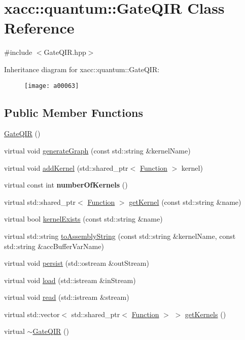 \hypertarget{a00063}{}\section{xacc\+:\+:quantum\+:\+:Gate\+Q\+IR Class Reference}
\label{a00063}


{\ttfamily \#include $<$Gate\+Q\+I\+R.\+hpp$>$}

Inheritance diagram for xacc\+:\+:quantum\+:\+:Gate\+Q\+IR\+:\begin{figure}[H]
\begin{center}
\leavevmode
\texttt{[image: a00063]}
\end{center}
\end{figure}
\subsection*{Public Member Functions}
\begin{DoxyCompactItemize}
\item 
\hyperlink{a00063_afb99f610a6b123538c659169c131a634}{Gate\+Q\+IR} ()
\item 
virtual void \hyperlink{a00063_ad1ddd6105346dd9fc78648fd812285ed}{generate\+Graph} (const std\+::string \&kernel\+Name)
\item 
virtual void \hyperlink{a00063_aa6ed2cf2cbcfec8105c327a4fa95346f}{add\+Kernel} (std\+::shared\+\_\+ptr$<$ \hyperlink{a00059}{Function} $>$ kernel)
\item 
virtual const int {\bfseries number\+Of\+Kernels} ()\hypertarget{a00063_aca6be85526b14f500e7f98954dd6da5c}{}\label{a00063_aca6be85526b14f500e7f98954dd6da5c}

\item 
virtual std\+::shared\+\_\+ptr$<$ \hyperlink{a00059}{Function} $>$ \hyperlink{a00063_a194758b6edcc3ae0c7fe8004f9bfe690}{get\+Kernel} (const std\+::string \&name)
\item 
virtual bool \hyperlink{a00063_a692f95099caa7c024110a3f035941dca}{kernel\+Exists} (const std\+::string \&name)
\item 
virtual std\+::string \hyperlink{a00063_a7153f7e9f516d43af3d5d4f95d60bd86}{to\+Assembly\+String} (const std\+::string \&kernel\+Name, const std\+::string \&acc\+Buffer\+Var\+Name)
\item 
virtual void \hyperlink{a00063_a40e1d07e4dfd3794ef53fca3cdbdca61}{persist} (std\+::ostream \&out\+Stream)
\item 
virtual void \hyperlink{a00063_a07f26eeb362ac480d20da6cdc8c8fb39}{load} (std\+::istream \&in\+Stream)
\item 
virtual void \hyperlink{a00063_a26019e2f1e13e64645e29aee86ac58b1}{read} (std\+::istream \&stream)
\item 
virtual std\+::vector$<$ std\+::shared\+\_\+ptr$<$ \hyperlink{a00059}{Function} $>$ $>$ \hyperlink{a00063_a4ace7ee5ebef84b1f39aaf5ed12c6cc6}{get\+Kernels} ()
\item 
virtual \hyperlink{a00063_ac88db03f1dd29e2d36aaa6c01a130008}{$\sim$\+Gate\+Q\+IR} ()
\end{DoxyCompactItemize}
